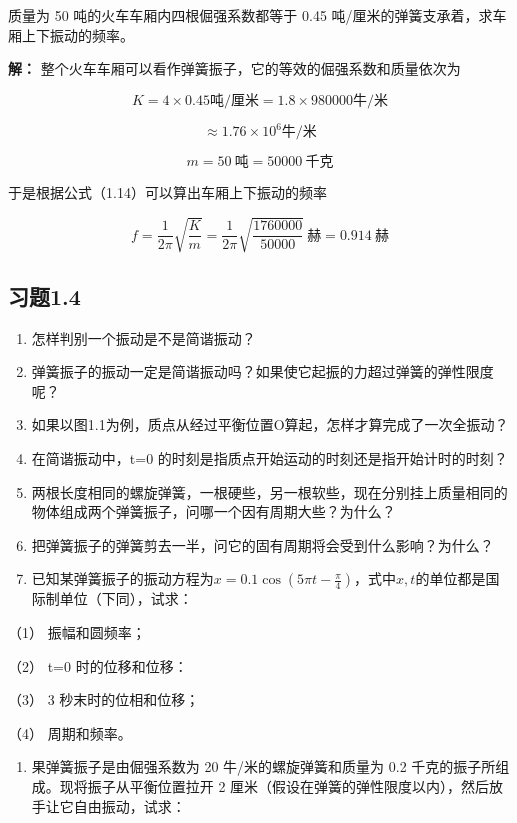 质量为 50 吨的火车车厢内四根倔强系数都等于 0.45
吨/厘米的弹簧支承着，求车厢上下振动的频率。

\textbf{解：}
整个火车车厢可以看作弹簧振子，它的等效的倔强系数和质量依次为

\[
K = 4 \times 0.45 \text{吨/厘米} = 1.8 \times 980000 \text{牛/米}
\]

\[
\approx 1.76 \times 10 ^ {6} \text{牛/米}
\]

\[
m=50\ \text{吨}=50000\ \text{千克}
\]

于是根据公式（1.14）可以算出车厢上下振动的频率

\[
f=\frac{1}{2\pi}\sqrt{\frac{K}{m}}=\frac{1}{2\pi}\sqrt{\frac{1760000}{50000}}\ \text{赫}=0.914\ \text{赫}
\]

\subsection{习题1.4}\label{ux4e60ux98981.4}

\begin{enumerate}
\def\labelenumi{\arabic{enumi}.}
\item
  怎样判别一个振动是不是简谐振动？
\item
  弹簧振子的振动一定是简谐振动吗？如果使它起振的力超过弹簧的弹性限度呢？
\item
  如果以图1.1为例，质点从经过平衡位置O算起，怎样才算完成了一次全振动？
\item
  在简谐振动中，t=0 的时刻是指质点开始运动的时刻还是指开始计时的时刻？
\item
  两根长度相同的螺旋弹簧，一根硬些，另一根软些，现在分别挂上质量相同的物体组成两个弹簧振子，问哪一个因有周期大些？为什么？
\item
  把弹簧振子的弹簧剪去一半，问它的固有周期将会受到什么影响？为什么？
\item
  已知某弹簧振子的振动方程为\(x = 0.1 \cos \left(5 \pi t - \frac{\pi}{4}\right)\)，式中\(x, t\)的单位都是国际制单位（下同），试求：
\end{enumerate}

（1） 振幅和圆频率；

（2） t=0 时的位移和位移：

（3） 3 秒末时的位相和位移；

（4） 周期和频率。

\begin{enumerate}
\def\labelenumi{\arabic{enumi}.}
\setcounter{enumi}{7}
\tightlist
\item
  果弹簧振子是由倔强系数为 20 牛/米的螺旋弹簧和质量为 0.2
  千克的振子所组成。现将振子从平衡位置拉开 2
  厘米（假设在弹簧的弹性限度以内），然后放手让它自由振动，试求：
\end{enumerate}

